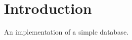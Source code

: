 \hypertarget{index_intro_sec}{}\section{Introduction}\label{index_intro_sec}
An implementation of a simple database. 